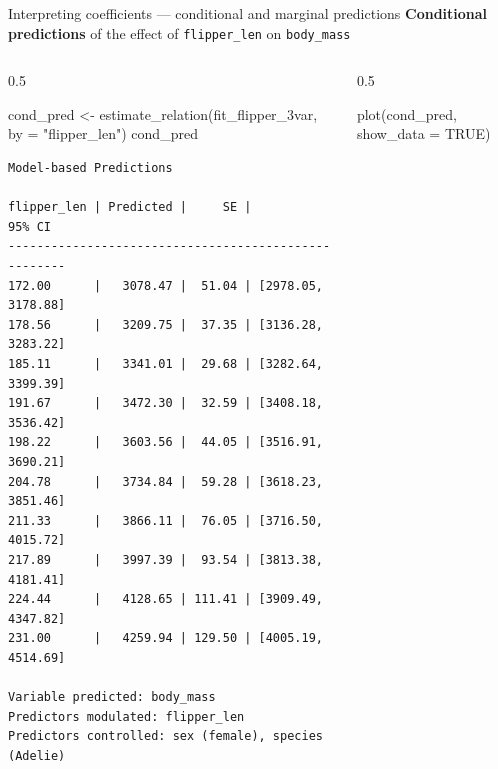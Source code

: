 \documentclass[
  10pt,
  ignorenonframetext,
  aspectratio=169,
  t]{beamer}
\newenvironment{Shaded}{\begin{snugshade}}{\end{snugshade}}
\newcommand{\AttributeTok}[1]{\textcolor[rgb]{0.40,0.45,0.13}{#1}}
\newcommand{\ConstantTok}[1]{\textcolor[rgb]{0.56,0.35,0.01}{#1}}
\newcommand{\FunctionTok}[1]{\textcolor[rgb]{0.28,0.35,0.67}{#1}}
\newcommand{\NormalTok}[1]{\textcolor[rgb]{0.00,0.23,0.31}{#1}}
\newcommand{\OtherTok}[1]{\textcolor[rgb]{0.00,0.23,0.31}{#1}}
\newcommand{\StringTok}[1]{\textcolor[rgb]{0.13,0.47,0.30}{#1}}
\newcommand{\bluebold}[1]{\textcolor{bluebeamer}{\textbf{#1}}}
\let\oldtexttt\texttt
\renewcommand{\texttt}[1]{\colorbox{gray!20}{\oldtexttt{#1}}}
\begin{document}
\begin{frame}[fragile]{Interpreting coefficients --- conditional and
marginal predictions}
\protect{}\label{interpreting-coefficients-conditional-and-marginal-predictions-1}
\bluebold{Conditional predictions} of the effect of
\texttt{flipper\_len} on \texttt{body\_mass}

\begin{columns}[T]
\begin{column}{0.5\linewidth}
\scriptsize

\begin{Shaded}
\begin{Highlighting}[]
\NormalTok{cond\_pred }\OtherTok{\textless{}{-}} \FunctionTok{estimate\_relation}\NormalTok{(fit\_flipper\_3var,}
                               \AttributeTok{by =} \StringTok{"flipper\_len"}\NormalTok{)}
\NormalTok{cond\_pred}
\end{Highlighting}
\end{Shaded}

\begin{verbatim}
Model-based Predictions

flipper_len | Predicted |     SE |             95% CI
-----------------------------------------------------
172.00      |   3078.47 |  51.04 | [2978.05, 3178.88]
178.56      |   3209.75 |  37.35 | [3136.28, 3283.22]
185.11      |   3341.01 |  29.68 | [3282.64, 3399.39]
191.67      |   3472.30 |  32.59 | [3408.18, 3536.42]
198.22      |   3603.56 |  44.05 | [3516.91, 3690.21]
204.78      |   3734.84 |  59.28 | [3618.23, 3851.46]
211.33      |   3866.11 |  76.05 | [3716.50, 4015.72]
217.89      |   3997.39 |  93.54 | [3813.38, 4181.41]
224.44      |   4128.65 | 111.41 | [3909.49, 4347.82]
231.00      |   4259.94 | 129.50 | [4005.19, 4514.69]

Variable predicted: body_mass
Predictors modulated: flipper_len
Predictors controlled: sex (female), species (Adelie)
\end{verbatim}

\normalsize
\end{column}

\begin{column}{0.5\linewidth}
\footnotesize

\begin{Shaded}
\begin{Highlighting}[]
\FunctionTok{plot}\NormalTok{(cond\_pred, }\AttributeTok{show\_data =} \ConstantTok{TRUE}\NormalTok{)}
\end{Highlighting}
\end{Shaded}


\end{column}
\end{columns}
\end{frame}
\end{document}
